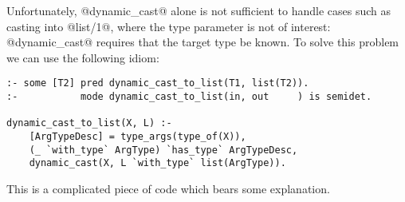 Unfortunately, @dynamic_cast@ alone is not sufficient to handle cases
such as casting into @list/1@, where the type parameter is not of
interest: @dynamic_cast@ requires that the target type be known.  To
solve this problem we can use the following idiom:
\begin{verbatim}
:- some [T2] pred dynamic_cast_to_list(T1, list(T2)).
:-           mode dynamic_cast_to_list(in, out     ) is semidet.

dynamic_cast_to_list(X, L) :-
    [ArgTypeDesc] = type_args(type_of(X)),
    (_ `with_type` ArgType) `has_type` ArgTypeDesc,
    dynamic_cast(X, L `with_type` list(ArgType)).
\end{verbatim}
This is a complicated piece of code which bears some explanation.
